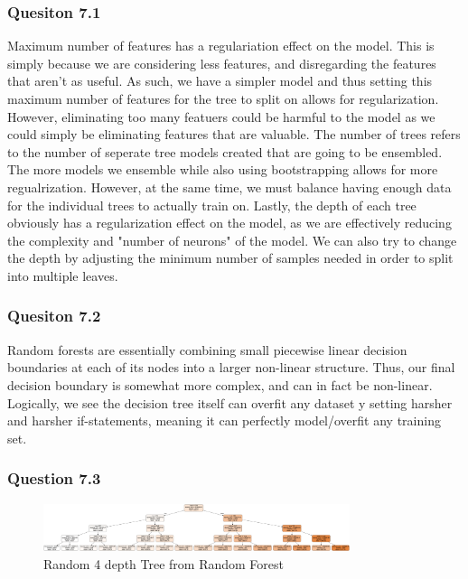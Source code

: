 \documentclass[11pt,letterpaper]{article}
\begin{document}
\subsubsection*{Quesiton 7.1}
Maximum number of features has a regulariation effect on the model. This is simply because we are considering less 
features, and disregarding the features that aren't as useful. As such, we have a simpler model and thus 
setting this maximum number of features for the tree to split on allows for regularization. However, eliminating
too many featuers could be harmful to the model as we could simply be eliminating features that are valuable.
The number of trees refers to the number of seperate tree models created that are going to be ensembled. The more models
we ensemble while
also using bootstrapping allows for more regualrization. However, at the same time, we must balance having enough data 
for the individual trees to actually train on. Lastly, the depth of each tree obviously has a regularization effect 
on the model, as we are effectively reducing the complexity and "number of neurons" of the model. We can also try 
to change the depth by adjusting the minimum number of samples needed in order to split into multiple leaves. 

\subsubsection*{Quesiton 7.2}
Random forests are essentially combining small piecewise linear decision boundaries 
at each of its nodes into a larger non-linear structure. Thus, our final decision 
boundary is somewhat more complex, and can in fact be non-linear. Logically, we see
the decision tree itself can overfit any dataset y setting harsher and harsher if-statements,
meaning it can perfectly model/overfit any training set. 
\subsubsection*{Question 7.3}

\begin{figure}[H]
    \centering
        \includegraphics[width=0.8\textwidth]{../Figures/tree.png}
    \hfill
       \caption{Random 4 depth Tree from Random Forest}
       \label{fig:boxPlots}
\end{figure}
\end{document}
